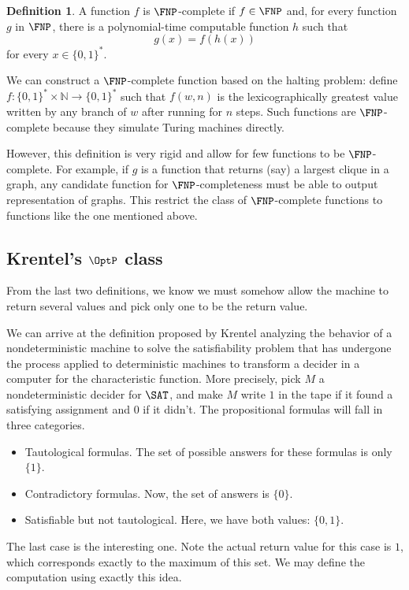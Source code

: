 \documentclass[12pt]{article}
\theoremstyle{definition}
\newtheorem{definition}{Definition}
\begin{document}
\begin{definition}
    A function $f$ is $\FNP$-complete if $f \in \FNP$ and,
    for every function $g$ in $\FNP$,
    there is a polynomial-time computable function $h$ such that
    \begin{equation*}
        g(x) = f(h(x))
    \end{equation*}
    for every $x \in \{0, 1\}^*$.
\end{definition}

We can construct a $\FNP$-complete function based on the halting problem:
define $f : \{0, 1\}^* \times \mathbb N \to \{0, 1\}^*$
such that $f(w, n)$ is the lexicographically greatest value written by any branch of $w$
after running for $n$ steps.
Such functions are $\FNP$-complete
because they simulate Turing machines directly.

However, this definition is very rigid
and allow for few functions to be $\FNP$-complete.
For example, if $g$ is a function that returns
(say) a largest clique in a graph,
any candidate function for $\FNP$-completeness
must be able to output representation of graphs.
This restrict the class of $\FNP$-complete functions
to functions like the one mentioned above.

\subsection{Krentel's $\OptP$ class}

From the last two definitions,
we know we must somehow allow the machine to return several values
and pick only one to be the return value.

We can arrive at the definition proposed by Krentel
analyzing the behavior of a nondeterministic machine to solve the satisfiability problem
that has undergone the process applied to deterministic machines
to transform a decider in a computer for the characteristic function.
More precisely,
pick $M$ a nondeterministic decider for $\SAT$,
and make $M$ write $1$ in the tape if it found a satisfying assignment
and $0$ if it didn't.
The propositional formulas will fall in three categories.
\begin{itemize}
    \item Tautological formulas.
        The set of possible answers for these formulas is only $\{1\}$.
    \item Contradictory formulas.
        Now, the set of answers is $\{0\}$.
    \item Satisfiable but not tautological.
        Here, we have both values: $\{0, 1\}$.
\end{itemize}
The last case is the interesting one.
Note the actual return value for this case is $1$,
which corresponds exactly to the maximum of this set.
We may define the computation using exactly this idea.
\end{document}

